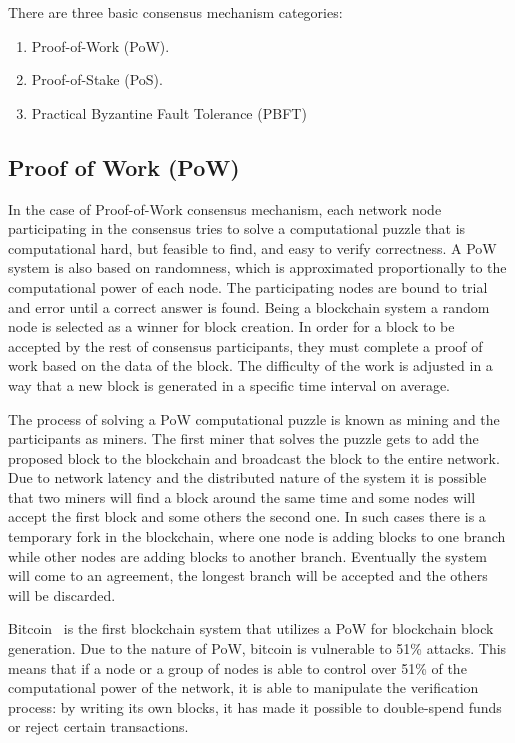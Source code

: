 There are three basic consensus mechanism categories:

\begin{enumerate}
  \item Proof-of-Work (PoW).
  \item Proof-of-Stake (PoS).
  \item Practical Byzantine Fault Tolerance (PBFT)
\end{enumerate}


\subsection{Proof of Work (PoW)}\label{bltech:consensus:pow}

In the case of Proof-of-Work consensus mechanism, each network node participating in
the consensus tries to solve a computational puzzle that is computational hard, but feasible to find, and easy to verify correctness.
A PoW system is also based on randomness, which is approximated proportionally to the computational power of each node.
The participating nodes are bound to trial and error until a correct answer is found. Being a blockchain system a random node is selected as a winner for block creation.
In order for a block to be accepted by the rest of consensus participants, they must complete a proof of work based on the data of the block.
The difficulty of the work is adjusted in a way that a new block is generated in a specific time interval on average.

The process of solving a PoW computational puzzle is known as mining and the participants as miners.
The first miner that solves the puzzle gets to add the proposed block to the blockchain and broadcast
the block to the entire network. Due to network latency and the distributed nature of the system it is possible that two miners will
find a block around the same time and some nodes will accept the first block and some others the second one. In such cases there is a temporary
fork in the blockchain, where one node is adding blocks to one branch while other nodes are adding blocks to another branch. Eventually the
system will come to an agreement, the longest branch will be accepted and the others will be discarded.

Bitcoin~\cite{Zohar:2015:BUH:2817191.2701411} is the first blockchain system that utilizes a PoW for blockchain block generation. Due to the nature of PoW, bitcoin is vulnerable to 51\% attacks.
This means that if a node or a group of nodes is able to control over 51\% of the computational power of the network, it is able to manipulate
the verification process: by writing its own blocks, it has made it possible to double-spend funds or reject certain transactions.

